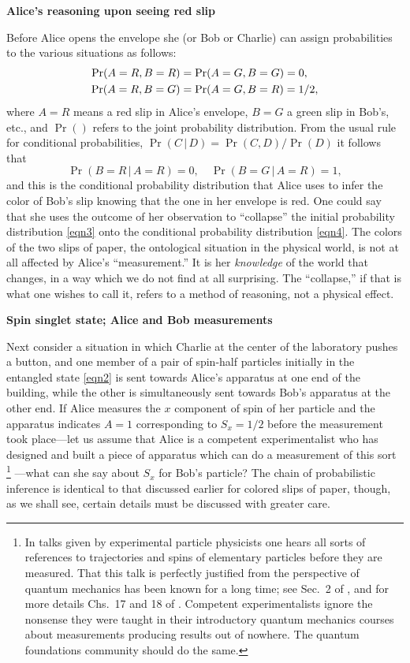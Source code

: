 \documentclass[12pt]{article} %
\def\outl#1{\par{\medskip\noindent\hspace*{.5cm}\bf
      \mathversion{bold}#1\mathversion{normal}\smallskip} }
\def\np{} \def\xa{} \def\xb{} \def\xn{} \def\xp{}
\def\outl#1{} \def\np{} \def\xa{} \def\xb{} \def\xn{} \def\xp{}
\def\outl#1{\par{\medskip\noindent\hspace*{.5cm}\bf
      \mathversion{bold}#1\mathversion{normal}\smallskip} }
\def\np{\newpage }\def\xn{\nopagebreak }\def\xp{\pagebreak }
\newcommand{\vb}{\,|\,}
\begin{document}
\xb
\outl{Alice's reasoning upon seeing red slip}
\xa




Before Alice opens the envelope she (or Bob or Charlie) can assign
probabilities to the various situations as follows:
\begin{align}
  \Pr(A=R,B=R) & = \Pr(A=G,B=G) = 0,
\notag\\ 
 \Pr(A=R,B=G) &= \Pr(A=G,B=R) = 1/2 ,
\label{eqn3}
\end{align}
where $A=R$ means a red slip in Alice's envelope, $B=G$ a green slip in Bob's,
etc., and $\Pr()$ refers to the joint probability distribution. From
the usual rule for conditional probabilities, $\Pr(C\vb D) = \Pr(C,D)/\Pr(D)$ 
it follows that
\begin{equation}
  \Pr(B=R\vb A=R) = 0,\quad \Pr(B=G\vb A=R) = 1,
\label{eqn4}
\end{equation}
and this is the conditional probability distribution that Alice uses to
infer the color of Bob's slip knowing that the one in her envelope is red.
One could say that she uses the outcome of her observation to ``collapse'' the
initial probability distribution \eqref{eqn3} onto the conditional probability
distribution \eqref{eqn4}.  The colors of the two slips of paper, the
ontological situation in the physical world, is not at all affected by Alice's
``measurement.''  It is her \emph{knowledge} of the world that changes, in a
way which we do not find at all surprising.  The ``collapse,'' if that is what
one wishes to call it, refers to a method of reasoning, not a physical effect.

\xb
\outl{Spin singlet state; Alice and Bob measurements}
\xa



Next consider a situation in which Charlie at the center of the laboratory
pushes a button, and one member of a pair of spin-half particles initially in
the entangled state \eqref{eqn2} is sent towards Alice's apparatus at one end
of the building, while the other is simultaneously sent towards Bob's
apparatus at the other end.  If Alice measures the $x$ component of spin of
her particle and the apparatus indicates $A=1$ corresponding to $S_x=1/2$
before the measurement took place---let us assume that Alice is a competent
experimentalist who has designed and built a piece of apparatus which can do a
measurement of this sort%
\footnote{In talks given by experimental particle physicists one hears all
  sorts of references to trajectories and spins of elementary particles before
  they are measured.  That this talk is perfectly justified from the
  perspective of quantum mechanics has been known for a long time; see Sec.~2
  of \cite{Grff84}, and for more details Chs.~17 and 18 of
  \cite{Grff02c}. Competent experimentalists ignore the nonsense they were
  taught in their introductory quantum mechanics courses about measurements
  producing results out of nowhere.  The quantum foundations community should
  do the same.}%
---what can she say about $S_x$ for Bob's
particle?  The chain of probabilistic inference is identical to that discussed
earlier for colored slips of paper, though, as we shall see, certain details
must be discussed with greater care.
\end{document}
